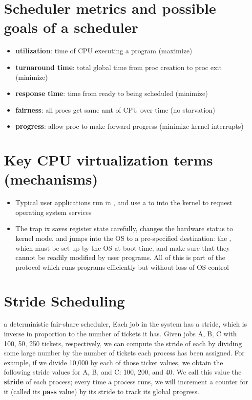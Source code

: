 \section*{Scheduler metrics and possible goals of a scheduler}
\begin{itemize}
\item \textbf{utilization}: time of CPU executing a program (maximize)
\item \textbf{turnaround time}:  total global time from proc creation to proc exit (minimize)
\item \textbf{response time}: time from ready to being scheduled (minimize)
\item \textbf{fairness}: all procs get same amt of CPU over time (no starvation)
\item \textbf{progress}: allow proc to make forward progress (minimize kernel interrupts)
\end{itemize}
\section*{Key CPU virtualization terms (mechanisms)}
\begin{itemize}
\item Typical user applications run in , and use a  to  into the kernel to request operating system services
\item The trap ix saves register state carefully, changes the hardware status to kernel mode, and jumps into the OS to a pre-specified destination: the , which must be set up by the OS at boot time, and make sure that they cannot be readily modified by user programs. All of this is part of the  protocol which runs programs efficiently but without loss of OS control
\end{itemize}
\section*{Stride Scheduling}
a deterministic fair-share scheduler, Each job in the system has a stride, which is inverse in proportion to the number of tickets it has. Given jobs A, B, C with 100, 50, 250 tickets, respectively, we can compute the stride of each by dividing some large number by the number of tickets each process has been assigned. For example, if we divide 10,000 by each of those ticket values, we obtain the following stride values for A, B, and C: 100, 200, and 40. We call this value the \textbf{stride} of each process; every time a process runs, we will increment a counter for it (called its \textbf{pass} value) by its stride to track its global progress.


